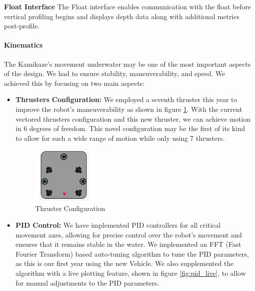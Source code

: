 \vspace{0.2cm}
\textbf{Float Interface}
The Float interface enables communication with the float before vertical profiling begins and displays depth data along with additional metrics post-profile.

\paragraph{Kinematics}
The Kamikaze's movement underwater may be one of the most important aspects of
the design. We had to ensure stability, maneuverability, and speed. We achieved
this by focusing on two main aspects:
\begin{itemize}
        
    \item \textbf{Thrusters Configuration:} We employed a seventh thruster this year to
        improve the robot's maneuverability as shown in figure \ref{fig:thruster}. With the current vectored thrusters
        configuration and this new thruster, we can achieve motion in 6 degrees of freedom.
        This novel configuration may be the first of its kind to allow for such a wide range of motion while only using 7 thrusters.
        \begin{figure}[h]
            \centering
            \includegraphics[width=0.3\textwidth]{Sections/2Design Rationale/images/Thrusters.png}
            \caption{Thruster Configuration}
            \label{fig:thruster}
        \end{figure}

        \item \textbf{PID Control:} We have implemented PID controllers for all critical movement axes, allowing for
        precise control over the robot's movement and ensures that it remains stable in the water. We implemented an FFT (Fast Fourier Transform)
        based auto-tuning algorithm to tune the PID parameters, as this is our first year using the new Vehicle. We also supplemented the algorithm with a live
        plotting feature, shown in figure \ref{fig:pid_live},
         to allow for manual adjustments to the PID parameters.
\end{itemize}
